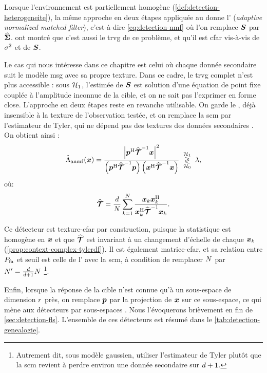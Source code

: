 Lorsque l'environnement est partiellement homogène (\cref{def:detection-heterogeneite}), la même approche en deux étapes appliquée au  donne l' (\emph{adaptive normalized matched filter}), c'est-à-dire \cref{eq:detection-nmf} où l'on remplace $\boldsymbol{S}$ par $\widehat{\boldsymbol{\Sigma}}$.  ont montré que c'est aussi le trvg de ce problème, et qu'il est cfar vis-à-vis de $\sigma^2$ et de $\boldsymbol{S}$.

Le cas qui nous intéresse dans ce chapitre est celui où chaque donnée secondaire suit le modèle msg avec sa propre texture. Dans ce cadre, le trvg complet n'est plus accessible : sous $\mathcal{H}_1$, l'estimée de $\boldsymbol{S}$ est solution d'une équation de point fixe couplée à l'amplitude inconnue de la cible, et on ne sait pas l'exprimer en forme close. L'approche en deux étapes reste en revanche utilisable. On garde le , déjà insensible à la texture de l'observation testée, et on remplace la scm par l'estimateur de Tyler, qui ne dépend pas des textures des données secondaires \cite{Conte2002,Gini2002,Pascal08a}. On obtient ainsi :
\begin{equation}
  \hat{\Lambda}_{\mathrm{anmf}}(\boldsymbol{x})
  =
  \frac{\left\lvert\boldsymbol{p}^{\mathrm{H}}{\widehat{\bm{\mathcal{T}}}}^{-1}\boldsymbol{x}\right\rvert^2}
       {\left(\boldsymbol{p}^{\mathrm{H}}{\widehat{\bm{\mathcal{T}}}}^{-1}\boldsymbol{p}\right)\left(\boldsymbol{x}^{\mathrm{H}}{\widehat{\bm{\mathcal{T}}}}^{-1}\boldsymbol{x}\right)}
  \;\underset{\mathcal{H}_0}{\overset{\mathcal{H}_1}{\gtrless}}\; \lambda,
  \label{eq:detection-anmf-tyler}
\end{equation}
où:
\begin{equation*}
  \widehat{\bm{\mathcal{T}}}
  =
  \frac{d}{N}\sum_{k=1}^{N}
  \frac{\boldsymbol{x}_k\boldsymbol{x}_k^{\mathrm{H}}}{\boldsymbol{x}_k^{\mathrm{H}}{\widehat{\bm{\mathcal{T}}}}^{-1}\boldsymbol{x}_k}.
\end{equation*}

Ce détecteur est texture-cfar par construction, puisque la statistique est homogène en $\boldsymbol{x}$ et que $\widehat{\bm{\mathcal{T}}}$ est invariant à un changement d'échelle de chaque $\boldsymbol{x}_k$ (\cref{prop:context-complex-tylerdf}). Il est également matrice-cfar, et sa relation entre $P_{\mathrm{fa}}$ et seuil est celle de l' avec la scm, à condition de remplacer $N$ par $N'=\frac{d}{d+1}N$ \footnote{Autrement dit, sous modèle gaussien, utiliser l'estimateur de Tyler plutôt que la scm revient à perdre environ une donnée secondaire sur $d+1$.}.

Enfin, lorsque la réponse de la cible n'est connue qu'à un sous-espace de dimension $r$ près, on remplace $\boldsymbol{p}$ par la projection de $\boldsymbol{x}$ sur ce sous-espace, ce qui mène aux détecteurs par sous-espaces \cite{Scharf1994,Kraut2001}. Nous l'évoquerons brièvement en fin de \cref{sec:detection-fls}. L'ensemble de ces détecteurs est résumé dans le \cref{tab:detection-genealogie}.

